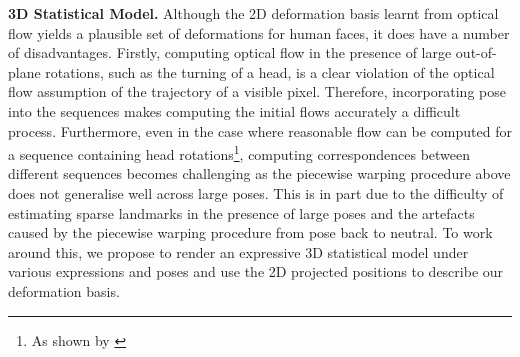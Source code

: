 \textbf{3D Statistical Model.}
Although the 2D deformation basis learnt from optical flow yields a plausible
set of deformations for human faces, it does have a number of disadvantages.
Firstly, computing optical flow in the presence of large out-of-plane rotations,
such as the turning of a head, is a clear violation of the optical flow assumption
of the trajectory of a visible pixel. Therefore, incorporating pose into the
sequences makes computing the initial flows accurately a difficult process.
Furthermore, even in the case where reasonable flow can be computed for a 
sequence containing head rotations\footnote{As shown by \citet{garg2013dense}},
computing correspondences between different sequences becomes challenging
as the piecewise warping procedure above does not generalise well across large
poses. This is in part due to the difficulty of estimating sparse landmarks
in the presence of large poses and the artefacts caused by the piecewise warping
procedure from pose back to neutral.
To work around this, we propose to render an expressive 3D statistical model
under various expressions and poses and use the 2D projected positions
to describe our deformation basis. 

